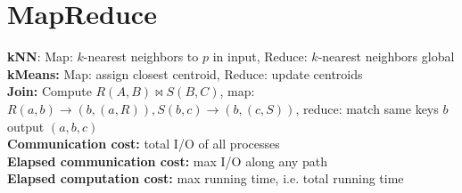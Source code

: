 \section*{MapReduce}
\textbf{kNN}: Map: $k$-nearest neighbors to $p$ in input, Reduce: $k$-nearest neighbors global\\
\textbf{kMeans:} Map: assign closest centroid, Reduce: update centroids\\
\textbf{Join:} Compute $R(A,B) \bowtie S(B,C)$, map: $R(a,b) \rightarrow (b,(a,R)), S(b,c) \rightarrow (b,(c,S))$, reduce: match same keys $b$ output $(a,b,c)$\\
\textbf{Communication cost:} total I/O of all processes\\
\textbf{Elapsed communication cost:} max I/O along any path\\
\textbf{Elapsed computation cost:} max running time, i.e. total running time\\